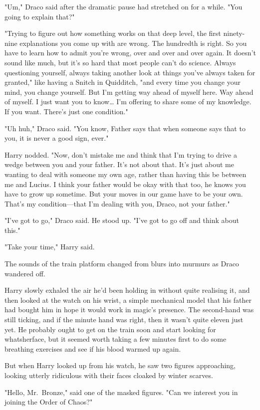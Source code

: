 "Um," Draco said after the dramatic pause had stretched on for a while. "You
going to explain that?"

"Trying to figure out how something works on that deep level, the first
ninety-nine explanations you come up with are wrong. The hundredth is right. So
you have to learn how to admit you're wrong, over and over and over again. It
doesn't sound like much, but it's so hard that most people can't do science.
Always questioning yourself, always taking another look at things you've always
taken for granted," like having a Snitch in Quidditch, "and every time you
change your mind, you change yourself. But I'm getting way ahead of myself
here. Way ahead of myself. I just want you to know{\ldots} I'm offering to
share some of my knowledge. If you want. There's just one condition."

"Uh huh," Draco said. "You know, Father says that when someone says that to
you, it is never a good sign, ever."

Harry nodded. "Now, don't mistake me and think that I'm trying to drive a wedge
between you and your father. It's not about that. It's just about me wanting to
deal with someone my own age, rather than having this be between me and Lucius.
I think your father would be okay with that too, he knows you have to grow up
sometime. But your moves in our game have to be your own. That's my
condition---that I'm dealing with you, Draco, not your father."

"I've got to go," Draco said. He stood up. "I've got to go off and think about
this."

"Take your time," Harry said.

The sounds of the train platform changed from blurs into murmurs as Draco
wandered off.

Harry slowly exhaled the air he'd been holding in without quite realising it,
and then looked at the watch on his wrist, a simple mechanical model that his
father had bought him in hope it would work in magic's presence. The
second-hand was still ticking, and if the minute hand was right, then it wasn't
quite eleven just yet. He probably ought to get on the train soon and start
looking for whatsherface, but it seemed worth taking a few minutes first to do
some breathing exercises and see if his blood warmed up again.

But when Harry looked up from his watch, he saw two figures approaching,
looking utterly ridiculous with their faces cloaked by winter scarves.

"Hello, Mr.~Bronze," said one of the masked figures. "Can we interest you in
joining the Order of Chaos?"
\sbreak
\vspace{-2\baselineskip}
